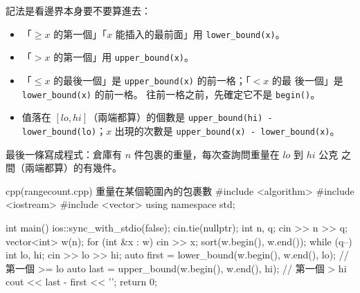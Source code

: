 \begin{center}
\diagcaption{在 $[150, 400]$ 之間的元素（橘色）剛好是 $[$\texttt{lower\_bound(150)}, \texttt{upper\_bound(400)}$)$ 這個半開區間，共 $5 - 1 = 4$ 個。}
\label{fig:srt-bounds}
\end{center}

記法是看邊界本身要不要算進去：

\begin{itemize}
\item 「$\ge x$ 的第一個」「$x$ 能插入的最前面」用 \texttt{lower\_bound(x)}。
\item 「$> x$ 的第一個」用 \texttt{upper\_bound(x)}。
\item 「$\le x$ 的最後一個」是 \texttt{upper\_bound(x)} 的前一格；「$< x$ 的最
後一個」是 \texttt{lower\_bound(x)} 的前一格。 往前一格之前，先確定它不是
\texttt{begin()}。
\item 值落在 $[lo, hi]$（兩端都算）的個數是
\texttt{upper\_bound(hi) - lower\_bound(lo)}；$x$ 出現的次數是
\texttt{upper\_bound(x) - lower\_bound(x)}。
\end{itemize}

最後一條寫成程式：倉庫有 $n$ 件包裹的重量，每次查詢問重量在 $lo$ 到 $hi$ 公克
之間（兩端都算）的有幾件。

\begin{example}[label=ex:srt-range]{cpp}{(rangecount.cpp) 重量在某個範圍內的包裹數}
#include <algorithm>
#include <iostream>
#include <vector>
using namespace std;

int main() {
    ios::sync_with_stdio(false);
    cin.tie(nullptr);
    int n, q;
    cin >> n >> q;
    vector<int> w(n);
    for (int &x : w) {
        cin >> x;
    }
    sort(w.begin(), w.end());
    while (q--) {
        int lo, hi;
        cin >> lo >> hi;
        auto first = lower_bound(w.begin(), w.end(), lo);   // 第一個 >= lo
        auto last = upper_bound(w.begin(), w.end(), hi);    // 第一個 > hi
        cout << last - first << '\n';
    }
    return 0;
}
\end{example}

